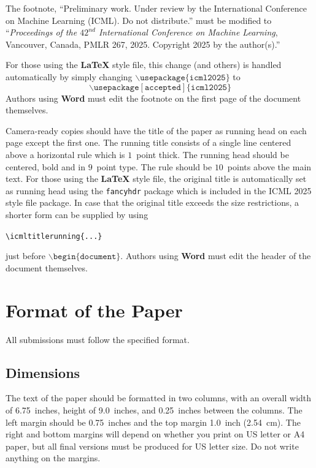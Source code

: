 \documentclass{article}
\theoremstyle{plain}
\theoremstyle{definition}
\theoremstyle{remark}
\begin{document}
The footnote, ``Preliminary work. Under review by the International
Conference on Machine Learning (ICML). Do not distribute.'' must be
modified to ``\textit{Proceedings of the
  $\mathit{42}^{nd}$ International Conference on Machine Learning},
Vancouver, Canada, PMLR 267, 2025.
Copyright 2025 by the author(s).''

For those using the \textbf{\LaTeX} style file, this change (and others) is
handled automatically by simply changing
$\mathtt{\backslash usepackage\{icml2025\}}$ to
$$\mathtt{\backslash usepackage[accepted]\{icml2025\}}$$
Authors using \textbf{Word} must edit the
footnote on the first page of the document themselves.

Camera-ready copies should have the title of the paper as running head
on each page except the first one. The running title consists of a
single line centered above a horizontal rule which is $1$~point thick.
The running head should be centered, bold and in $9$~point type. The
rule should be $10$~points above the main text. For those using the
\textbf{\LaTeX} style file, the original title is automatically set as running
head using the \texttt{fancyhdr} package which is included in the ICML
2025 style file package. In case that the original title exceeds the
size restrictions, a shorter form can be supplied by using

\verb|\icmltitlerunning{...}|

just before $\mathtt{\backslash begin\{document\}}$.
Authors using \textbf{Word} must edit the header of the document themselves.

\section{Format of the Paper}

All submissions must follow the specified format.

\subsection{Dimensions}

The text of the paper should be formatted in two columns, with an
overall width of 6.75~inches, height of 9.0~inches, and 0.25~inches
between the columns. The left margin should be 0.75~inches and the top
margin 1.0~inch (2.54~cm). The right and bottom margins will depend on
whether you print on US letter or A4 paper, but all final versions
must be produced for US letter size.
Do not write anything on the margins.
\end{document}
